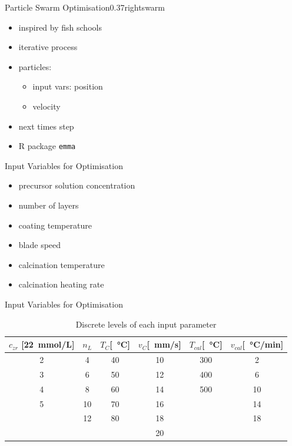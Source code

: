 \documentclass[hyperref={pdfpagelabels=false}, aspectratio=43, t]{beamer}  %
\begin{document}
\begin{graphicsFrame}{Particle Swarm Optimisation}{}{0.37}{right}{swarm}{}
	\vspace{3em}
	\begin{itemize}
		\item inspired by fish schools %
		\item iterative process %
		\item particles: 
			\begin{itemize}
				\item input vars: position 
				\item velocity
			\end{itemize}
		\item next times step
		\item R package \texttt{emma} 
	\end{itemize}
\end{graphicsFrame}

\begin{frame}{Input Variables for Optimisation}
	\begin{itemize}
		\item precursor solution concentration
		\item number of layers 
		\item coating temperature
		\item blade speed
		\item calcination temperature
		\item calcination heating rate
	\end{itemize}
\end{frame}

\begin{frame}{Input Variables for Optimisation}
\begin{table}[htb]
	\centering
	\begin{tabular}{cc cc cc}
		\hline\hline
		$c_{zr}$ [22\SI{}{\milli\mol/\liter}]	&$n_L$	&$T_{C}$[\SI{}{\degreeCelsius}]	&$v_{C}$[\SI{}{\milli\meter/\second}]	&$T_{cal}$[\SI{}{\degreeCelsius}]	&$v_{cal}$[\SI{}{\degreeCelsius/\minute}]	\\
		\hline
		2				&4		&40					&10				&300				&2	\\
		3				&6		&50					&12				&400				&6	\\
		4				&8		&60					&14				&500				&10	\\
		5				&10		&70					&16				&					&14	\\
						&12		&80					&18				&					&18	\\
						&		&					&20				&					& \\
		\hline\hline
	\end{tabular}
	\caption{Discrete levels of each input parameter }
	\label{tab:input}
\end{table}
\end{frame}
\end{document}
